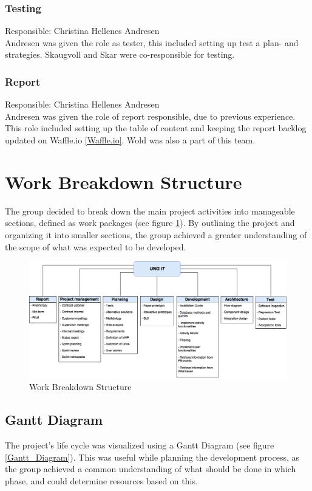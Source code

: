 \subsubsection{Testing}
Responsible: Christina Hellenes Andresen\\
Andresen was given the role as tester, this included setting up test a plan- and strategies. Skaugvoll and Skar were co-responsible for testing. 

\subsubsection{Report}
Responsible: Christina Hellenes Andresen\\
Andresen was given the role of report responsible, due to previous experience. This role included setting up the table of content and keeping the report backlog updated on Waffle.io \ref{Waffle.io}. Wold was also a part of this team.

\section{Work Breakdown Structure}
The group decided to break down the main project activities into manageable sections, defined as work packages (see figure \ref{Work_Breakdown_Structure}). By outlining the project and organizing it into smaller sections, the group achieved a greater understanding of the scope of what was expected to be developed.

\begin{figure}[ht]
\centering
    \includegraphics[width=1\textwidth]{fig/work_packages_new}
\caption{Work Breakdown Structure}
\label{Work_Breakdown_Structure}
\end{figure}

\subsection{Gantt Diagram} \label{GanttDiagram}
The project's life cycle was visualized using a Gantt Diagram (see figure \ref{Gantt_Diagram}). This was useful while planning the development process, as the group achieved a common understanding of what should be done in which phase, and could determine resources based on this. 

